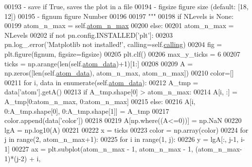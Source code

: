 \begin{DoxyCode}
{{00193 \textcolor{stringliteral}{            - save     if True, saves the plot in a file}
00194 \textcolor{stringliteral}{            - figsize  figure size (default: [18, 12])}
00195 \textcolor{stringliteral}{            - fignum    figure Number}
00196 \textcolor{stringliteral}{}
00197 \textcolor{stringliteral}{        """}
00198         \textcolor{keywordflow}{if} NLevels \textcolor{keywordflow}{is} \textcolor{keywordtype}{None}:
00199             atom\_n\_max = self.\hyperlink{classpyneb_1_1plot_1_1plot_atomic_data_1_1_data_plot_a668572cfe9a684e7195535d60d343938}{atom\_n\_max}
00200         \textcolor{keywordflow}{else}:
00201             atom\_n\_max = NLevels
00202         \textcolor{keywordflow}{if} \textcolor{keywordflow}{not} pn.config.INSTALLED[\textcolor{stringliteral}{'plt'}]:
00203             pn.log\_.error(\textcolor{stringliteral}{'Matplotlib not installed!'}, calling=self.\hyperlink{classpyneb_1_1plot_1_1plot_atomic_data_1_1_data_plot_a393a133b607541c57d5ebc5a34687e3f}{calling})
00204         fig = plt.figure(fignum, figsize=figsize)
00205         plt.clf()
00206         max\_y\_ticks = 6
00207         ticks = np.arange(len(self.\hyperlink{classpyneb_1_1plot_1_1plot_atomic_data_1_1_data_plot_aee33ad460a38cb4293a5bd89cec12294}{atom\_data})+1)[1:] 
00208         
00209         A = np.zeros([len(self.\hyperlink{classpyneb_1_1plot_1_1plot_atomic_data_1_1_data_plot_aee33ad460a38cb4293a5bd89cec12294}{atom\_data}), atom\_n\_max, atom\_n\_max])
00210         color=[]
00211         \textcolor{keywordflow}{for} i, data \textcolor{keywordflow}{in} enumerate(self.\hyperlink{classpyneb_1_1plot_1_1plot_atomic_data_1_1_data_plot_aee33ad460a38cb4293a5bd89cec12294}{atom\_data}):
00212             A\_tmp = data[\textcolor{stringliteral}{'atom'}].getA()
00213             \textcolor{keywordflow}{if} A\_tmp.shape[0] > atom\_n\_max:
00214                 A[i, :] = A\_tmp[0:atom\_n\_max, 0:atom\_n\_max]
00215             \textcolor{keywordflow}{else}:
00216                 A[i, 0:A\_tmp.shape[0], 0:A\_tmp.shape[1]] = A\_tmp
00217             color.append(data[\textcolor{stringliteral}{'color'}])
00218         
00219         A[np.where((A<=0))] = np.NaN
00220         lgA = np.log10(A)
00221         
00222         x = ticks
00223         color = np.array(color)
00224         \textcolor{keywordflow}{for} j \textcolor{keywordflow}{in} range(2, atom\_n\_max+1):
00225             \textcolor{keywordflow}{for} i \textcolor{keywordflow}{in} range(1, j):
00226                 y = lgA[:, j-1, i-1]
00227                 ax = plt.subplot(atom\_n\_max - 1, atom\_n\_max - 1, (atom\_n\_max-1)*(j-2) + i,
}}
\end{DoxyCode}

